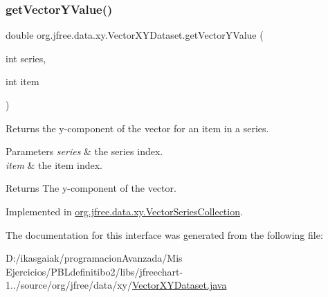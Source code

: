 \subsubsection{\texorpdfstring{get\+Vector\+Y\+Value()}{getVectorYValue()}}
{\footnotesize\ttfamily double org.\+jfree.\+data.\+xy.\+Vector\+X\+Y\+Dataset.\+get\+Vector\+Y\+Value (\begin{DoxyParamCaption}\item[{int}]{series,  }\item[{int}]{item }\end{DoxyParamCaption})}

Returns the y-\/component of the vector for an item in a series.


\begin{DoxyParams}{Parameters}
{\em series} & the series index. \\
\hline
{\em item} & the item index.\\
\hline
\end{DoxyParams}
\begin{DoxyReturn}{Returns}
The y-\/component of the vector. 
\end{DoxyReturn}


Implemented in \mbox{\hyperlink{classorg_1_1jfree_1_1data_1_1xy_1_1_vector_series_collection_a70d900e7ff5c26b9b94b607b820d6567}{org.\+jfree.\+data.\+xy.\+Vector\+Series\+Collection}}.



The documentation for this interface was generated from the following file\+:\begin{DoxyCompactItemize}
\item 
D\+:/ikasgaiak/programacion\+Avanzada/\+Mis Ejercicios/\+P\+B\+Ldefinitibo2/libs/jfreechart-\/1../source/org/jfree/data/xy/\mbox{\hyperlink{_vector_x_y_dataset_8java}{Vector\+X\+Y\+Dataset.\+java}}\end{DoxyCompactItemize}
